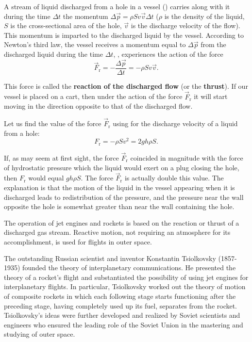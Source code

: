 A stream of liquid discharged from a hole in a vessel () carries along with it during the time $\Delta t$ the momentum $\Delta\vec{p}=\rho Sv\vec{v}\Delta t$ ($\rho$ is the density of the liquid, $S$ is the cross-sectional area of the hole, $\vec{v}$ is the discharge velocity of the flow). This momentum is imparted to the discharged liquid by the vessel. According to Newton's third law, the vessel receives a momentum equal to $\Delta\vec{p}$ from the discharged liquid during the time $\Delta t$, \ie, experiences the action of the force
\begin{equation}\label{eq:9_7}
	\vec{F}_{\text{r}} = -\frac{\Delta\vec{p}}{\Delta t} = -\rho Sv\vec{v}.
\end{equation}

\noindent
This force is called the \textbf{reaction of the discharged flow} (or the \textbf{thrust}). If our vessel is placed on a cart, then under the action of the force $\vec{F}_{\text{r}}$ it will start moving in the direction opposite to that of the discharged flow.

Let us find the value of the force $\vec{F}_{\text{r}}$ using  for the discharge velocity of a liquid from a hole:
\begin{equation}\label{eq:9_8}
	F_{\text{r}} = -\rho Sv^2 = 2gh\rho S.
\end{equation}

\noindent
If, as may seem at first sight, the force $\vec{F}_{\text{r}}$ coincided in magnitude with the force of hydrostatic pressure which the liquid would exert on a plug closing the hole, then $F_{\text{r}}$ would equal $gh\rho S$. The force $\vec{F}_{\text{r}}$ is actually double this value. The explanation is that the motion of the liquid in the vessel appearing when it is discharged leads to redistribution of the pressure, and the pressure near the wall opposite the hole is somewhat greater than near the wall containing the hole.

The operation of jet engines and rockets is based on the reaction or thrust of a discharged gas stream. Reactive motion, not requiring an atmosphere for its accomplishment, is used for flights in outer space.

The outstanding Russian scientist and inventor Konstantin
Tsiolkovsky (1857-1935) founded the theory of interplanetary communications. He presented the theory of a rocket's flight and substantiated the possibility of using jet engines for interplanetary flights. In particular, Tsiolkovsky worked out the theory of motion of composite rockets in which each following stage starts functioning after the preceding stage, having completely used up its fuel, separates from the rocket. Tsiolkovsky's ideas were further developed and realized by Soviet scientists and engineers who ensured the leading role of the Soviet Union in the mastering and studying of outer space.

